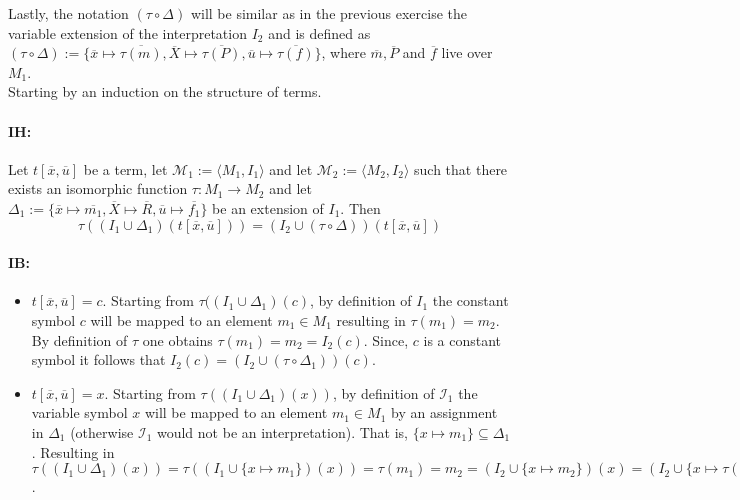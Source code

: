 \documentclass[11pt,a4paper]{article}
\begin{document}
Lastly, the notation $(\tau \circ \Delta)$ will be similar as in the previous exercise the variable extension of the interpretation $I_2$ and is defined as $(\tau \circ \Delta):=\{\overline{x} \mapsto \overline{\tau(m)}, \overline{X} \mapsto \overline{\tau(P)},\overline{u} \mapsto \overline{\tau(f)}\}$, where $\overline{m}, \overline{P}$ and $\overline{f}$ live over $M_1$.\\

Starting by an induction on the structure of terms.
\paragraph*{IH:} Let $t[\overline{x},\overline{u}]$ be a term, let $\mathcal{M}_1 := \langle M_1, I_1\rangle$ and let $\mathcal{M}_2 := \langle M_2, I_2\rangle$ such that there exists an isomorphic function $\tau : M_1 \to M_2$ and let $\Delta_1:= \{\overline{x} \mapsto \overline{m_1}, \overline{X} \mapsto \overline{R}, \overline{u} \mapsto \overline{f_1}\}$ be an extension of $I_1$. Then 
\begin{equation*}
\tau((I_1 \cup \Delta_1)(t[\overline{x},\overline{u}]))= (I_2 \cup (\tau \circ \Delta))(t[\overline{x},\overline{u}])
\end{equation*}

\paragraph*{IB:}
\begin{itemize}[leftmargin=*]
\item $t[\overline{x},\overline{u}]= c$. Starting from $\tau((I_1 \cup \Delta_1)(c)$, by definition of $I_1$ the constant symbol $c$ will be mapped to an element $m_1 \in M_1$ resulting in $\tau(m_1)=m_2$. By  definition of $\tau$ one obtains $\tau(m_1)=m_2=I_2(c)$. Since, $c$ is a constant symbol it follows that $I_2(c) = (I_2\cup (\tau \circ \Delta_1))(c)$.\\

\item $t[\overline{x},\overline{u}]= x$. Starting from $\tau((I_1 \cup \Delta_1)(x))$, by definition of $\mathcal{I}_1$ the variable symbol $x$ will be mapped to an element $m_1 \in M_1$ by an assignment in $\Delta_1$ (otherwise $\mathcal{I}_1$ would not be an interpretation). That is, $\{x \mapsto m_1\} \subseteq \Delta_1$. Resulting in $\tau((I_1 \cup \Delta_1)(x)) = \tau((I_1 \cup \{x \mapsto m_1\})(x))= \tau(m_1)= m_2 = (I_2 \cup \{x \mapsto m_2\})(x) =  (I_2 \cup \{x \mapsto \tau(m_1)\})(x) = (I_2 \cup (\tau \circ \Delta_1))(x)$.
\end{itemize}
\end{document}
